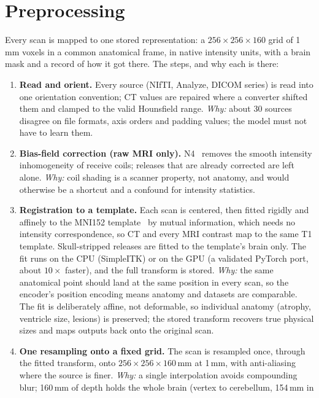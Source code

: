 \documentclass[10pt]{article}
\begin{document}
\section{Preprocessing}

Every scan is mapped to one stored representation: a $256\times256\times160$ grid of 1\,mm voxels in a common
anatomical frame, in native intensity units, with a brain mask and a record of how it got there. The steps, and why
each is there:

\begin{enumerate}
  \item \textbf{Read and orient.} Every source (NIfTI, Analyze, DICOM series) is read into one orientation convention;
  CT values are repaired where a converter shifted them and clamped to the valid Hounsfield range.
  \textit{Why:} about 30 sources disagree on file formats, axis orders and padding values; the model must not have to
  learn them.
  \item \textbf{Bias-field correction (raw MRI only).} N4~\cite{n4} removes the smooth intensity inhomogeneity of
  receive coils; releases that are already corrected are left alone. \textit{Why:} coil shading is a scanner
  property, not anatomy, and would otherwise be a shortcut and a confound for intensity statistics.
  \item \textbf{Registration to a template.} Each scan is centered, then fitted rigidly and affinely to the MNI152
  template~\cite{mni} by mutual information, which needs no intensity correspondence, so CT and every MRI contrast map
  to the same T1 template. Skull-stripped releases are fitted to the template's brain only. The fit runs on the CPU
  (SimpleITK) or on the GPU (a validated PyTorch port, about $10\times$ faster), and the full transform is stored.
  \textit{Why:} the same anatomical point should land at the same position in every scan, so the encoder's position
  encoding means anatomy and datasets are comparable. The fit is deliberately affine, not deformable, so individual
  anatomy (atrophy, ventricle size, lesions) is preserved; the stored transform recovers true physical sizes and maps
  outputs back onto the original scan.
  \item \textbf{One resampling onto a fixed grid.} The scan is resampled once, through the fitted transform, onto
  $256\times256\times160$\,mm at 1\,mm, with anti-aliasing where the source is finer. \textit{Why:} a single
  interpolation avoids compounding blur; 160\,mm of depth holds the whole brain (vertex to cerebellum, 154\,mm in

\end{enumerate}
\end{document}
